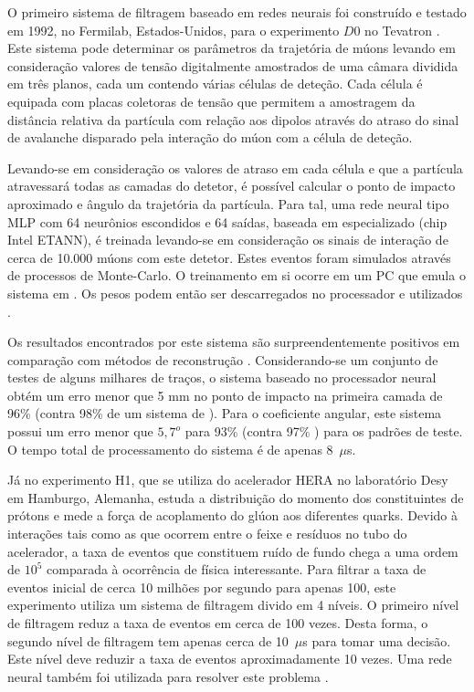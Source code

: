 O primeiro sistema de filtragem baseado em redes neurais foi construído e
testado em 1992, no Fermilab, Estados-Unidos, para o experimento $D0$ no
Tevatron \cite{lindsey-nim-1992}. Este sistema pode determinar os parâmetros
da trajetória de múons levando em consideração valores de tensão digitalmente
amostrados de uma câmara dividida em três planos, cada um contendo várias
células de deteção. Cada célula é equipada com placas coletoras de tensão que
permitem a amostragem da distância relativa da partícula com relação aos
dipolos através do atraso do sinal de avalanche disparado pela interação do
múon com a célula de deteção.

Levando-se em consideração os valores de atraso em cada célula e que a
partícula atravessará todas as camadas do detetor, é possível calcular o ponto
de impacto aproximado e ângulo da trajetória da partícula. Para tal, uma
rede neural tipo MLP com 64 neurônios escondidos e 64 saídas, baseada em
 especializado (chip Intel ETANN), é treinada levando-se em
consideração os sinais de interação de cerca de 10.000 múons com este
detetor. Estes eventos foram simulados através de processos de Monte-Carlo. O
treinamento em si ocorre em um PC que emula o sistema em . Os
pesos podem então ser descarregados no processador e utilizados
.

Os resultados encontrados por este sistema são surpreendentemente positivos em
comparação com métodos de reconstrução . Considerando-se um
conjunto de testes de alguns milhares de traços, o sistema baseado no
processador neural obtém um erro menor que 5 mm no ponto de impacto na
primeira camada de 96\% (contra 98\% de um sistema de 
). Para o coeficiente angular, este sistema possui um erro menor
que $5,7^{o}$ para 93\% (contra 97\% ) para os padrões de
teste. O tempo total de processamento do sistema é de apenas 8~$\mu$s.

Já no experimento H1, que se utiliza do acelerador HERA no laboratório Desy em
Hamburgo, Alemanha, estuda a distribuição do momento dos constituintes de
prótons e mede a força de acoplamento do glúon aos diferentes quarks. Devido à
interações tais como as que ocorrem entre o feixe e resíduos no tubo do
acelerador, a taxa de eventos que constituem ruído de fundo chega a uma ordem
de $10^5$ comparada à ocorrência de física interessante. Para filtrar a taxa
de eventos inicial de cerca 10 milhões por segundo para apenas 100, este
experimento utiliza um sistema de filtragem divido em 4 níveis. O primeiro
nível de filtragem reduz a taxa de eventos em cerca de 100 vezes. Desta forma,
o segundo nível de filtragem tem apenas cerca de 10~$\mu$s para tomar uma
decisão. Este nível deve reduzir a taxa de eventos aproximadamente 10
vezes. Uma rede neural também foi utilizada para resolver este problema
\cite{kohne-nim-1997}. 

